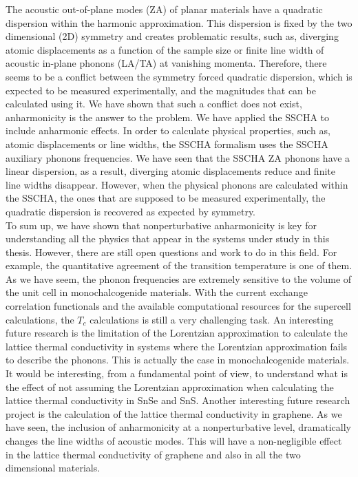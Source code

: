 The acoustic out-of-plane modes (ZA) of planar materials have a quadratic dispersion within the harmonic 
approximation. This dispersion is fixed by the two dimensional (2D) symmetry and creates problematic 
results, such as, diverging atomic displacements as a function of the sample size or finite line width of acoustic 
in-plane phonons (LA/TA) at vanishing momenta. Therefore, there seems to be a conflict between the symmetry forced 
quadratic dispersion, which is expected to be measured experimentally, and the magnitudes that can be calculated 
using it. We have shown that such a conflict does not exist, anharmonicity is the answer to the problem. We have 
applied the SSCHA to include anharmonic effects. In order to calculate physical properties, such as, atomic 
displacements or line widths, the SSCHA formalism uses the SSCHA auxiliary phonons frequencies. We have seen that 
the SSCHA ZA phonons have a linear dispersion, as a result, diverging atomic displacements reduce and finite line 
widths disappear. However, when the physical phonons are calculated within the SSCHA, the ones that are supposed to 
be measured experimentally, the quadratic dispersion is recovered as expected by symmetry. \\

To sum up, we have shown that nonperturbative anharmonicity is key for understanding all the physics that appear 
in the systems under study in this thesis. However, there are still open questions and work to do in this field. For 
example, the quantitative agreement of the transition temperature is one of them. As we have seem, the phonon 
frequencies are extremely sensitive to the volume of the unit cell in monochalcogenide materials. With the current 
exchange correlation functionals and the available computational resources for the supercell calculations, the 
$T_{c}$ calculations is still a very challenging task. An interesting future research is the limitation of the 
Lorentzian approximation to calculate the lattice thermal conductivity in systems where the Lorentzian approximation
fails to describe the phonons. This is actually the case in monochalcogenide materials. It would be interesting, from 
a fundamental point of view, to understand what is the effect of not assuming the Lorentzian approximation when 
calculating the lattice thermal conductivity in SnSe and SnS. Another interesting future research project is the 
calculation of the lattice thermal conductivity in graphene. As we have seen, the inclusion of anharmonicity at 
a nonperturbative level, dramatically changes the line widths of acoustic modes. This will have a non-negligible 
effect in the lattice thermal conductivity of graphene and also in all the two dimensional materials.

